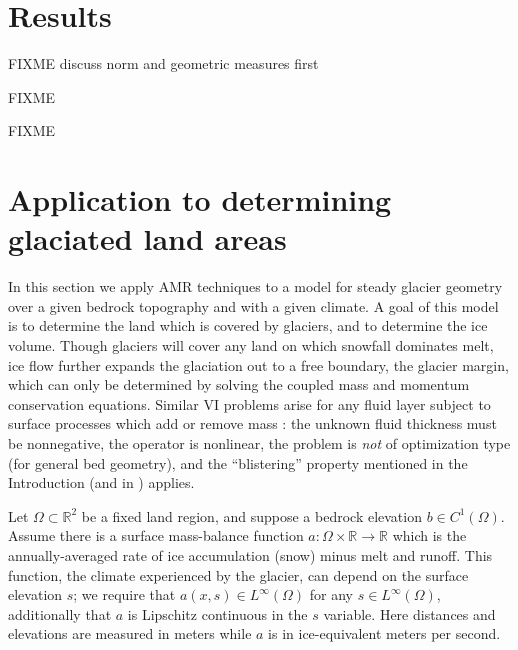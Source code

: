 \documentclass[]{interact}
\theoremstyle{plain}%
\theoremstyle{definition}
\theoremstyle{remark}
\newcommand{\RR}{\mathbb{R}}
\begin{document}
\section{Results} \label{sec:results}

FIXME discuss norm and geometric measures first

FIXME \cite{Kosub2016} \cite{JungeblutKleistMiltzow2022}

FIXME


\section{Application to determining glaciated land areas} \label{sec:app}

In this section we apply AMR techniques to a model for steady glacier geometry over a given bedrock topography and with a given climate.  A goal of this model is to determine the land which is covered by glaciers, and to determine the ice volume.  Though glaciers will cover any land on which snowfall dominates melt, ice flow further expands the glaciation out to a free boundary, the glacier margin, which can only be determined by solving the coupled mass and momentum conservation equations.  Similar VI problems arise for any fluid layer subject to surface processes which add or remove mass \cite{Bueler2021b}: the unknown fluid thickness must be nonnegative, the operator is nonlinear, the problem is \emph{not} of optimization type (for general bed geometry), and the ``blistering'' property mentioned in the Introduction (and in \cite{JouvetBueler2012}) applies.

Let $\Omega \subset \RR^2$ be a fixed land region, and suppose a bedrock elevation $b \in C^1(\Omega)$.   Assume there is a surface mass-balance \cite{GreveBlatter2009} function $a:\Omega \times \RR \to \RR$ which is the annually-averaged rate of ice accumulation (snow) minus melt and runoff.  This function, the climate experienced by the glacier, can depend on the surface elevation $s$; we require that $a(x,s)\in L^\infty(\Omega)$ for any $s\in L^\infty(\Omega)$, additionally that $a$ is Lipschitz continuous in the $s$ variable.  Here distances and elevations are measured in meters while $a$ is in ice-equivalent meters per second.
\end{document}
